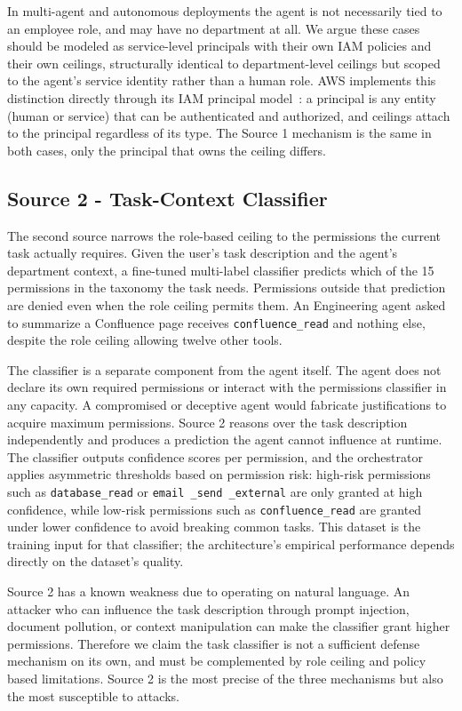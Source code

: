 \documentclass{article}
\theoremstyle{plain}
\theoremstyle{definition}
\theoremstyle{remark}
\begin{document}
In multi-agent and autonomous deployments the agent is not necessarily 
tied to an employee role, and may have no department at all. We argue 
these cases should be modeled as service-level principals with their own 
IAM policies and their own ceilings, structurally identical to 
department-level ceilings but scoped to the agent's service identity 
rather than a human role. AWS implements this distinction directly through 
its IAM principal model~\citep{aws-iam-principals}: a principal is any 
entity (human or service) that can be authenticated and authorized, and 
ceilings attach to the principal regardless of its type. The Source 1 
mechanism is the same in both cases, only the principal that owns the 
ceiling differs.

\subsection{Source 2 - Task-Context Classifier}

The second source narrows the role-based ceiling to the permissions the 
current task actually requires. Given the user's task description and the 
agent's department context, a fine-tuned multi-label classifier predicts 
which of the 15 permissions in the taxonomy the task needs. Permissions 
outside that prediction are denied even when the role ceiling permits them. 
An Engineering agent asked to summarize a Confluence page receives 
\texttt{confluence\_read} and nothing else, despite the role ceiling 
allowing twelve other tools.

The classifier is a separate component from the agent itself. The agent 
does not declare its own required permissions or interact with the 
permissions classifier in any capacity. A compromised or deceptive agent 
would fabricate justifications to acquire maximum permissions. Source 2 
reasons over the task description independently and produces a prediction 
the agent cannot influence at runtime. The classifier outputs confidence 
scores per permission, and the orchestrator applies asymmetric thresholds 
based on permission risk: high-risk permissions such 
as \texttt{database\_read} or \texttt{email \_send \_external} are only granted 
at high confidence, while low-risk permissions such 
as \texttt{confluence\_read} are granted under lower confidence to avoid 
breaking common tasks. This dataset is the training input for that 
classifier; the architecture's empirical performance depends directly on 
the dataset's quality.

Source 2 has a known weakness due to operating on natural language. An 
attacker who can influence the task description through prompt injection, 
document pollution, or context manipulation can make the classifier grant 
higher permissions. Therefore we claim the task classifier is not a 
sufficient defense mechanism on its own, and must be complemented by role 
ceiling and policy based limitations. Source 2 is the most precise of the 
three mechanisms but also the most susceptible to attacks.
\end{document}
